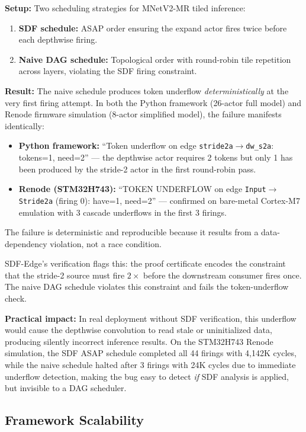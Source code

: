 \documentclass[journal]{IEEEtran}
\begin{document}
\textbf{Setup:}
Two scheduling strategies for MNetV2-MR tiled inference:
\begin{enumerate}[nosep]
\item \textbf{SDF schedule:} ASAP order ensuring the expand actor fires twice before each depthwise firing.
\item \textbf{Naive DAG schedule:} Topological order with round-robin tile repetition across layers, violating the SDF firing constraint.
\end{enumerate}

\textbf{Result:}
The naive schedule produces token underflow \emph{deterministically} at the very first firing attempt.
In both the Python framework (26-actor full model) and Renode firmware simulation (8-actor simplified model), the failure manifests identically:
\begin{itemize}[nosep]
\item \textbf{Python framework:} ``Token underflow on edge \texttt{stride2a$\to$dw\_s2a}: tokens=1, need=2'' --- the depthwise actor requires 2 tokens but only 1 has been produced by the stride-2 actor in the first round-robin pass.
\item \textbf{Renode (STM32H743):} ``TOKEN UNDERFLOW on edge \texttt{Input$\to$Stride2a} (firing 0): have=1, need=2'' --- confirmed on bare-metal Cortex-M7 emulation with 3 cascade underflows in the first 3 firings.
\end{itemize}
The failure is deterministic and reproducible because it results from a data-dependency violation, not a race condition.

SDF-Edge's verification flags this: the proof certificate encodes the constraint that the stride-2 source must fire $2\times$ before the downstream consumer fires once.
The naive DAG schedule violates this constraint and fails the token-underflow check.

\textbf{Practical impact:}
In real deployment without SDF verification, this underflow would cause the depthwise convolution to read stale or uninitialized data, producing silently incorrect inference results.
On the STM32H743 Renode simulation, the SDF ASAP schedule completed all 44 firings with 4{,}142K cycles, while the naive schedule halted after 3 firings with 24K cycles due to immediate underflow detection, making the bug easy to detect \emph{if} SDF analysis is applied, but invisible to a DAG scheduler.

\subsection{Framework Scalability}
\end{document}
